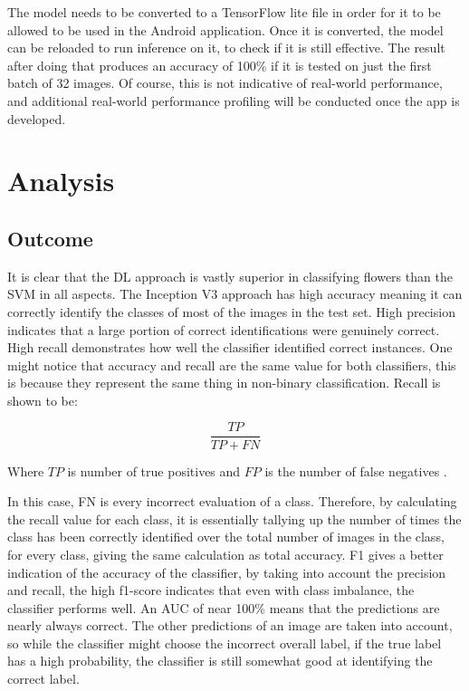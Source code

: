 \documentclass[12pt,a4paper]{report}
\begin{document}
The model needs to be converted to a TensorFlow lite file in order for it to be allowed to be used in the Android 
application. Once it is converted, the model can be reloaded to run inference on it, to check if it is still effective. The 
result after doing that produces an accuracy of 100\% if it is tested on just the first batch of 32 images. Of course, 
this is not indicative of real-world performance, and additional real-world performance profiling will be conducted
once the app is developed. 

\section{Analysis}

\subsection{Outcome}

It is clear that the DL approach is vastly superior in classifying flowers than the SVM in all aspects. The Inception V3
approach has high accuracy meaning it can correctly identify the classes of most of the images in the test set. 
High precision indicates that a large portion of correct identifications were genuinely correct. High recall demonstrates
how well the classifier identified correct instances. One might notice that accuracy and recall are the same value for 
both classifiers, this is because they represent the same thing in non-binary classification. Recall is shown to be:

\begin{equation}
    \frac{TP}{TP+FN}
\end{equation}

Where \(TP\) is number of true positives and \(FP\) is the number of false negatives \citep{googledevrecall}.

\par

In this case, FN is every incorrect evaluation of a class. Therefore, by calculating the recall value for each class,
it is essentially tallying up the number of times the class has been correctly identified over the total number of 
images in the class, for every class, giving the same calculation as total accuracy. F1 gives a better indication of 
the accuracy of 
the classifier, by taking into account the precision and recall, the high f1-score indicates that even with class 
imbalance, the classifier performs well. An AUC of near 100\% means that the predictions are nearly always 
correct. The other predictions of an image are taken into account, so while the classifier might choose the incorrect 
overall label, if the true label has a high probability, the classifier is still somewhat good at 
identifying the correct label.
\end{document}
